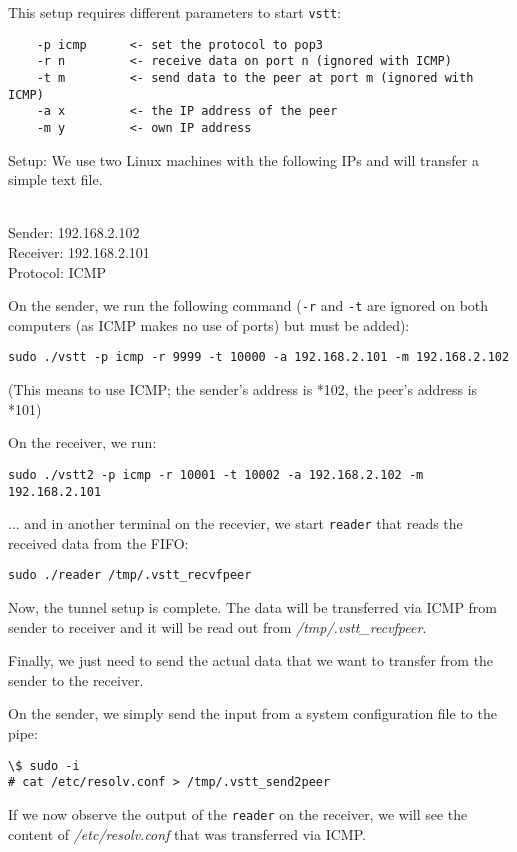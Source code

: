 \documentclass[10pt,a4paper]{article}
\begin{document}
This setup requires different parameters to start \texttt{vstt}:

\begin{verbatim}
	-p icmp      <- set the protocol to pop3
	-r n         <- receive data on port n (ignored with ICMP)
	-t m         <- send data to the peer at port m (ignored with ICMP)
	-a x         <- the IP address of the peer
	-m y         <- own IP address
\end{verbatim}
 
 
Setup: We use two Linux machines with the following IPs and will transfer a simple text file.

~\\
Sender:   192.168.2.102\\
Receiver: 192.168.2.101\\
Protocol: ICMP

On the sender, we run the following command (\texttt{-r} and \texttt{-t} are ignored on both computers (as ICMP makes no use of ports) but must be added):

\texttt{sudo ./vstt -p icmp -r 9999 -t 10000 -a 192.168.2.101 -m 192.168.2.102}

(This means to use ICMP; the sender's address is *102, the peer's address is *101)

On the receiver, we run:

\texttt{sudo ./vstt2 -p icmp -r 10001 -t 10002 -a 192.168.2.102 -m 192.168.2.101}

... and in another terminal on the recevier, we start \texttt{reader} that reads the received data from the FIFO:

\texttt{sudo ./reader /tmp/.vstt\_recvfpeer}

Now, the tunnel setup is complete. The data will be transferred via ICMP
from sender to receiver and it will be read out from \textit{/tmp/.vstt\_recvfpeer}.

Finally, we just need to send the actual data that we want to transfer from the sender to the receiver.

On the sender, we simply send the input from a system configuration file to the pipe:

\begin{verbatim}
\$ sudo -i
# cat /etc/resolv.conf > /tmp/.vstt_send2peer
\end{verbatim}

If we now observe the output of the \texttt{reader} on the receiver, we will see
the content of \textit{/etc/resolv.conf} that was transferred via ICMP.
\end{document}
